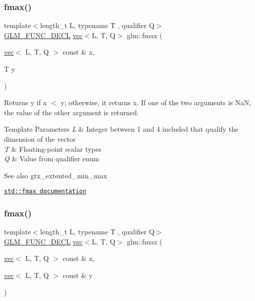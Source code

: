 \subsubsection{\texorpdfstring{fmax()}{fmax()}\hspace{0.1cm}{\footnotesize\ttfamily [2/3]}}
{\footnotesize\ttfamily template$<$length\+\_\+t L, typename T , qualifier Q$>$ \\
\hyperlink{setup_8hpp_ab2d052de21a70539923e9bcbf6e83a51}{G\+L\+M\+\_\+\+F\+U\+N\+C\+\_\+\+D\+E\+CL} \hyperlink{structglm_1_1vec}{vec}$<$L, T, Q$>$ glm\+::fmax (\begin{DoxyParamCaption}\item[{\hyperlink{structglm_1_1vec}{vec}$<$ L, T, Q $>$ const \&}]{x,  }\item[{T}]{y }\end{DoxyParamCaption})}

Returns y if x $<$ y; otherwise, it returns x. If one of the two arguments is NaN, the value of the other argument is returned.


\begin{DoxyTemplParams}{Template Parameters}
{\em L} & Integer between 1 and 4 included that qualify the dimension of the vector \\
\hline
{\em T} & Floating-\/point scalar types \\
\hline
{\em Q} & Value from qualifier enum\\
\hline
\end{DoxyTemplParams}
\begin{DoxySeeAlso}{See also}
gtx\+\_\+extented\+\_\+min\+\_\+max 

\href{http://en.cppreference.com/w/cpp/numeric/math/fmax}{\tt std\+::fmax documentation} 
\end{DoxySeeAlso}
\mbox{\label{group__gtx__extended__min__max_ga538c9e7de1d0cb8157e548691487d32a}} 
\subsubsection{\texorpdfstring{fmax()}{fmax()}\hspace{0.1cm}{\footnotesize\ttfamily [3/3]}}
{\footnotesize\ttfamily template$<$length\+\_\+t L, typename T , qualifier Q$>$ \\
\hyperlink{setup_8hpp_ab2d052de21a70539923e9bcbf6e83a51}{G\+L\+M\+\_\+\+F\+U\+N\+C\+\_\+\+D\+E\+CL} \hyperlink{structglm_1_1vec}{vec}$<$L, T, Q$>$ glm\+::fmax (\begin{DoxyParamCaption}\item[{\hyperlink{structglm_1_1vec}{vec}$<$ L, T, Q $>$ const \&}]{x,  }\item[{\hyperlink{structglm_1_1vec}{vec}$<$ L, T, Q $>$ const \&}]{y }\end{DoxyParamCaption})}

